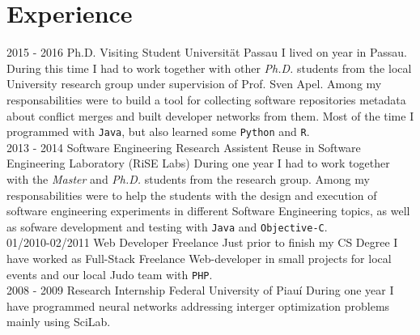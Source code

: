 \documentclass[]{friggeri-cv}
\begin{document}
\section{Experience}
\begin{entrylist}
    \entry
    {2015 - 2016}
    {Ph.D. Visiting Student}
    {Universit\"at Passau}
    {I lived on year in Passau. During this time I had to work together with other \textit{Ph.D.} students from the local University research group under supervision of Prof. Sven Apel. Among my responsabilities were to build a tool for collecting software repositories metadata about conflict merges and built developer networks from them. Most of the time I programmed with \texttt{Java}, but also learned some \texttt{Python} and \texttt{R}. \\}
  \entry
    {2013 - 2014}
    {Software Engineering Research Assistent}
    {Reuse in Software Engineering Laboratory (RiSE Labs)}
    {During one year I had to work together with the \textit{Master} and \textit{Ph.D.} students from the research group. Among my responsabilities were to help the students with the design and execution of software engineering experiments in different Software Engineering topics, as well as sofware development and testing with \texttt{Java} and \texttt{Objective-C}. \\}
  \entry
    {01/2010-02/2011}
    {Web Developer}
    {Freelance}
    {Just prior to finish my CS Degree I have worked as Full-Stack Freelance Web-developer in small projects for local events and our local Judo team with \texttt{PHP}.\\}
    \entry
    {2008 - 2009}
    {Research Internship}
    {Federal University of Piauí}
    {During one year I have programmed neural networks addressing interger optimization problems mainly using SciLab.}
   
\end{entrylist}



\newpage
\end{document}

